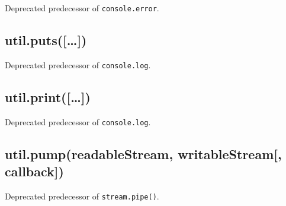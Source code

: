 Deprecated predecessor of \texttt{console.error}.

\subsection{util.puts({[}\ldots{}{]})}\label{util.puts}

\begin{Shaded}
\begin{Highlighting}[]
 \NormalTok{() }
\end{Highlighting}
\end{Shaded}

Deprecated predecessor of \texttt{console.log}.

\subsection{util.print({[}\ldots{}{]})}\label{util.print}

\begin{Shaded}
\begin{Highlighting}[]
 
\end{Highlighting}
\end{Shaded}

Deprecated predecessor of \texttt{console.log}.

\subsection{util.pump(readableStream, writableStream{[},
callback{]})}\label{util.pumpreadablestream-writablestream-callback}

\begin{Shaded}
\begin{Highlighting}[]
 
\end{Highlighting}
\end{Shaded}

Deprecated predecessor of \texttt{stream.pipe()}.
